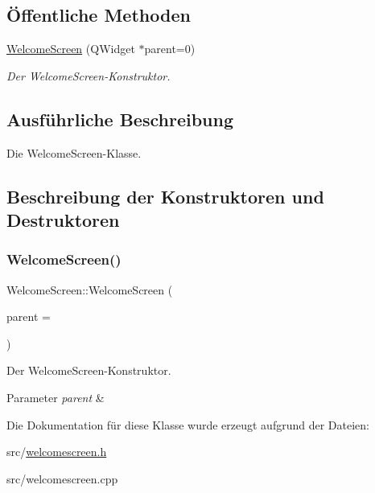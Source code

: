 \subsection*{Öffentliche Methoden}
\begin{DoxyCompactItemize}
\item 
\hyperlink{class_welcome_screen_a5935d49d3bc2f3aae45db144bbbd4db2}{Welcome\+Screen} (Q\+Widget $\ast$parent=0)
\begin{DoxyCompactList}\small\item\em Der Welcome\+Screen-\/\+Konstruktor. \end{DoxyCompactList}\end{DoxyCompactItemize}


\subsection{Ausführliche Beschreibung}
Die Welcome\+Screen-\/\+Klasse. 

\subsection{Beschreibung der Konstruktoren und Destruktoren}
\hypertarget{class_welcome_screen_a5935d49d3bc2f3aae45db144bbbd4db2}{}\label{class_welcome_screen_a5935d49d3bc2f3aae45db144bbbd4db2} 
\subsubsection{\texorpdfstring{Welcome\+Screen()}{WelcomeScreen()}}
{\footnotesize\ttfamily Welcome\+Screen\+::\+Welcome\+Screen (\begin{DoxyParamCaption}\item[{Q\+Widget $\ast$}]{parent = {} }\end{DoxyParamCaption})\hspace{0.3cm}{\ttfamily [explicit]}}



Der Welcome\+Screen-\/\+Konstruktor. 


\begin{DoxyParams}{Parameter}
{\em parent} & \\
\hline
\end{DoxyParams}


Die Dokumentation für diese Klasse wurde erzeugt aufgrund der Dateien\+:\begin{DoxyCompactItemize}
\item 
src/\hyperlink{welcomescreen_8h}{welcomescreen.\+h}\item 
src/welcomescreen.\+cpp\end{DoxyCompactItemize}
